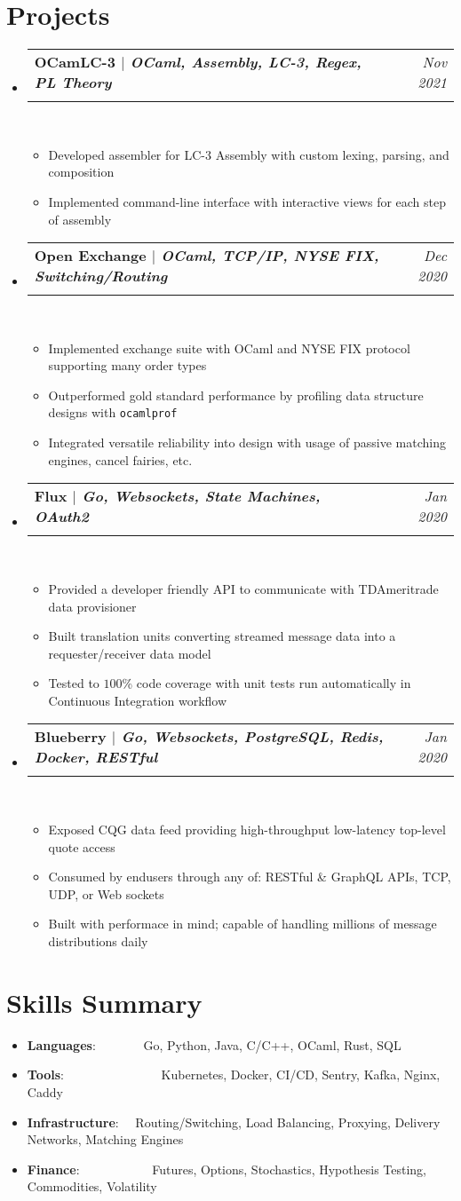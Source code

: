 \documentclass[a4paper,11pt]{extarticle}
\makeatletter
\newcommand{\resumeSkillItem}[2]{
	\item\small{
		\textbf{#1}{: #2 \vspace{-2pt}}
	}
}
\newcommand{\resumeItem}[1]{
	\item\small{
		#1 \vspace{-2pt}
	}
}
\newcommand{\resumeSubheading}[4]{
	\vspace{-1pt}\item
		\begin{tabular*}{0.97\textwidth}{l@{\extracolsep{\fill}}r}
			\textbf{#1} & #2 \\
			\textit{#3} & \textit{#4} \\
		\end{tabular*}\vspace{-3pt}
}
\newcommand{\resumeSubItem}[2]{\resumeSkillItem{#1}{#2}\vspace{-5pt}}
\newcommand{\resumeSubHeadingListStart}{\begin{itemize}[leftmargin=0.15in,label={}]}
\newcommand{\resumeSubHeadingListEnd}{\end{itemize}}
\newcommand{\resumeItemListStart}{\begin{itemize}\vspace{-3pt}}
\newcommand{\resumeItemListEnd}{\end{itemize}\vspace{-3pt}}
\makeatother
\begin{document}
\section{Projects}
	\resumeSubHeadingListStart
		\resumeSubheading{OCamLC-3 $|$ 
		{\normalfont \small \textit 
		{OCaml, Assembly, LC-3, Regex, PL Theory}}}
		{\textit{Nov 2021}}{}{}\\[-12pt]
		\resumeItemListStart
			\resumeItem{Developed assembler for LC-3 Assembly with custom
			lexing, parsing, and composition}
			\resumeItem{Implemented command-line interface with interactive
			views for each step of assembly}
		\resumeItemListEnd
		\resumeSubheading{Open Exchange $|$ 
		{\normalfont \small \textit 
		{OCaml, TCP/IP, NYSE FIX, Switching/Routing}}}
		{\textit{Dec 2020}}{}{}\\[-12pt]
		\resumeItemListStart
			\resumeItem{Implemented exchange suite with OCaml and NYSE
				FIX protocol supporting many order types}
			\resumeItem{Outperformed gold standard performance by profiling
				data structure designs with \texttt{ocamlprof}}
			\resumeItem{Integrated versatile reliability into design with 
				usage of passive matching engines, cancel fairies, etc.}
		\resumeItemListEnd
		\resumeSubheading{Flux $|$ 
		{\normalfont \small \textit 
		{Go, Websockets, State Machines, OAuth2}}}
		{\textit{Jan 2020}}{}{}\\[-12pt]
		\resumeItemListStart
			\resumeItem{Provided a developer friendly API to communicate with
				TDAmeritrade data provisioner}
			\resumeItem{Built translation units converting streamed message
				data into a requester/receiver data model}
			\resumeItem{Tested to $100$\% code coverage with unit tests 
				run automatically in Continuous Integration workflow}
		\resumeItemListEnd
		\resumeSubheading{Blueberry $|$ 
		{\normalfont \small \textit 
		{Go, Websockets, PostgreSQL, Redis, Docker, RESTful}}}
		{\textit{Jan 2020}}{}{}\\[-12pt]
		\resumeItemListStart
			\resumeItem{Exposed CQG data feed providing high-throughput
			low-latency top-level quote access}
			\resumeItem{Consumed by endusers through any of:
			RESTful \& GraphQL APIs, TCP, UDP, or Web sockets}
			\resumeItem{Built with performace in mind; capable of handling
			millions of message distributions daily}
		\resumeItemListEnd
	\resumeSubHeadingListEnd

\section{Skills Summary}
	\resumeSubHeadingListStart
		\resumeSubItem{Languages}
			{\hspace{0.6mm}~~~~~~~Go, Python, Java, C/C++, OCaml, Rust, SQL}
		\resumeSubItem{Tools}
			{\hspace{0.3mm}~~~~~~~~~~~~~~~Kubernetes, Docker, CI/CD, Sentry,
				Kafka, Nginx, Caddy}
		\resumeSubItem{Infrastructure}
			{~~Routing/Switching, Load Balancing, Proxying, Delivery Networks,
			 Matching Engines}
		\resumeSubItem{Finance}
			{\hspace{0.7mm}~~~~~~~~~~~Futures, Options, Stochastics, Hypothesis
				Testing, Commodities, Volatility}
	\resumeSubHeadingListEnd
\end{document}
